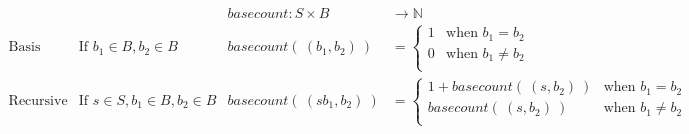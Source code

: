 \documentclass[12pt, oneside]{article}
\newcommand{\A}[0]{\texttt{A}}
\newcommand{\C}[0]{\texttt{C}}
\newcommand{\G}[0]{\texttt{G}}
\newcommand{\U}[0]{\texttt{U}}
\begin{document}
\[
\begin{array}{llll}
& & \textit{basecount} : S \times B & \to \mathbb{N} \\
\textrm{Basis Step:} &  \textrm{If } b_1 \in B, b_2 \in B & \textit{basecount}(~(b_1, b_2)~) & =
        \begin{cases}
            1 & \textrm{when } b_1 = b_2 \\
            0 & \textrm{when } b_1 \neq b_2 \\
        \end{cases} \\
\textrm{Recursive Step:} & \textrm{If } s \in S, b_1 \in B, b_2 \in B &\textit{basecount}(~(s b_1, b_2)~) & =
        \begin{cases}
            1 + \textit{basecount}(~(s, b_2)~) & \textrm{when } b_1 = b_2 \\
            \textit{basecount}(~(s, b_2)~) & \textrm{when } b_1 \neq b_2 \\
        \end{cases}
\end{array}
\]

 \vfill
\end{document}
